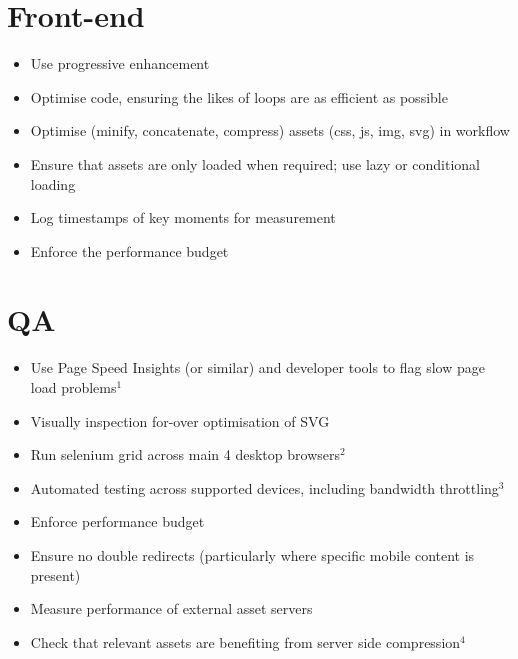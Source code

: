 \documentclass[letterpaper,10pt,english]{sphinxmanual}
\begin{document}
\section{Front-end}
\label{performance_plan:front-end}\begin{itemize}
\item {} 
Use progressive enhancement

\item {} 
Optimise code, ensuring the likes of loops are as efficient as possible

\item {} 
Optimise (minify, concatenate, compress) assets (css, js, img, svg) in workflow

\item {} 
Ensure that assets are only loaded when required; use lazy or conditional loading

\item {} 
Log timestamps of key moments for measurement

\item {} 
Enforce the performance budget

\end{itemize}


\section{QA}
\label{performance_plan:qa}\begin{itemize}
\item {} 
Use Page Speed Insights (or similar) and developer tools to flag slow page load problems$^{\text{1}}$

\item {} 
Visually inspection for-over optimisation of SVG

\item {} 
Run selenium grid across main 4 desktop browsers$^{\text{2}}$

\item {} 
Automated testing across supported devices, including bandwidth throttling$^{\text{3}}$

\item {} 
Enforce performance budget

\item {} 
Ensure no double redirects (particularly where specific mobile content is present)

\item {} 
Measure performance of external asset servers

\item {} 
Check that relevant assets are benefiting from server side compression$^{\text{4}}$

\end{itemize}
\end{document}
